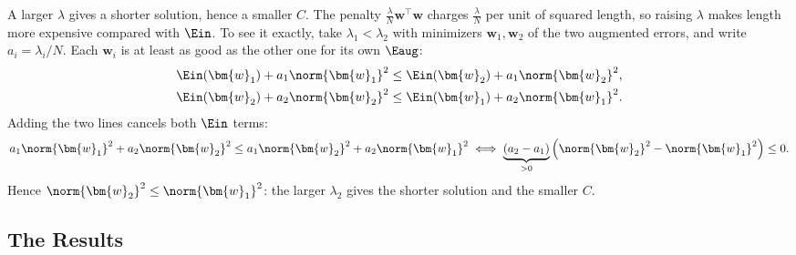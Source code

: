 \begin{remark}
    A larger \(\lambda\) gives a shorter solution, hence a smaller \(C\). The
    penalty \(\frac{\lambda}{N} \bm{w}^\top \bm{w}\) charges \(\frac{\lambda}{N}\)
    per unit of squared length, so raising \(\lambda\) makes length more
    expensive compared with \(\Ein\). To see it exactly, take \(\lambda_1 <
    \lambda_2\) with minimizers \(\bm{w}_1, \bm{w}_2\) of the two augmented
    errors, and write \(a_i = \lambda_i / N\). Each \(\bm{w}_i\) is at least as
    good as the other one for its own \(\Eaug\):
    \begin{align*}
        \Ein(\bm{w}_1) + a_1 \norm{\bm{w}_1}^2 &\le \Ein(\bm{w}_2) + a_1
        \norm{\bm{w}_2}^2 ,\\
        \Ein(\bm{w}_2) + a_2 \norm{\bm{w}_2}^2 &\le \Ein(\bm{w}_1) + a_2
        \norm{\bm{w}_1}^2 .
    \end{align*}
    Adding the two lines cancels both \(\Ein\) terms:
    \[
        a_1 \norm{\bm{w}_1}^2 + a_2 \norm{\bm{w}_2}^2 \le a_1
        \norm{\bm{w}_2}^2 + a_2 \norm{\bm{w}_1}^2
        \iff
        \underbrace{(a_2 - a_1)}_{> 0} \left( \norm{\bm{w}_2}^2 -
        \norm{\bm{w}_1}^2 \right) \le 0 .
    \]
    Hence \(\norm{\bm{w}_2}^2 \le \norm{\bm{w}_1}^2\): the larger \(\lambda_2\)
    gives the shorter solution and the smaller \(C\).
\end{remark}

\subsection{The Results}

